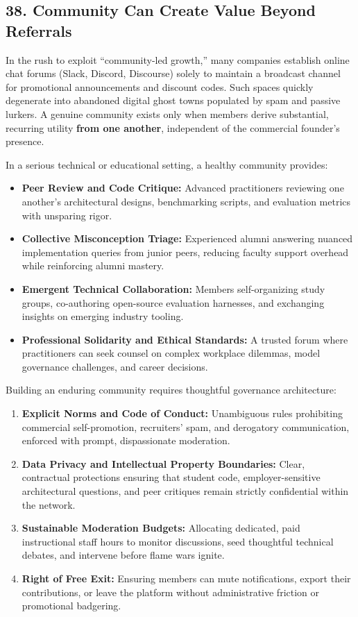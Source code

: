 \subsection*{38. Community Can Create Value Beyond Referrals}

In the rush to exploit ``community-led growth,'' many companies establish online chat forums (Slack, Discord, Discourse) solely to maintain a broadcast channel for promotional announcements and discount codes. Such spaces quickly degenerate into abandoned digital ghost towns populated by spam and passive lurkers. A genuine community exists only when members derive substantial, recurring utility \textbf{from one another}, independent of the commercial founder's presence.

In a serious technical or educational setting, a healthy community provides:
\begin{itemize}[leftmargin=*]
\item \textbf{Peer Review and Code Critique:} Advanced practitioners reviewing one another's architectural designs, benchmarking scripts, and evaluation metrics with unsparing rigor.
\item \textbf{Collective Misconception Triage:} Experienced alumni answering nuanced implementation queries from junior peers, reducing faculty support overhead while reinforcing alumni mastery.
\item \textbf{Emergent Technical Collaboration:} Members self-organizing study groups, co-authoring open-source evaluation harnesses, and exchanging insights on emerging industry tooling.
\item \textbf{Professional Solidarity and Ethical Standards:} A trusted forum where practitioners can seek counsel on complex workplace dilemmas, model governance challenges, and career decisions.
\end{itemize}

Building an enduring community requires thoughtful governance architecture:
\begin{enumerate}[leftmargin=*]
\item \textbf{Explicit Norms and Code of Conduct:} Unambiguous rules prohibiting commercial self-promotion, recruiters' spam, and derogatory communication, enforced with prompt, dispassionate moderation.
\item \textbf{Data Privacy and Intellectual Property Boundaries:} Clear, contractual protections ensuring that student code, employer-sensitive architectural questions, and peer critiques remain strictly confidential within the network.
\item \textbf{Sustainable Moderation Budgets:} Allocating dedicated, paid instructional staff hours to monitor discussions, seed thoughtful technical debates, and intervene before flame wars ignite.
\item \textbf{Right of Free Exit:} Ensuring members can mute notifications, export their contributions, or leave the platform without administrative friction or promotional badgering.
\end{enumerate}

